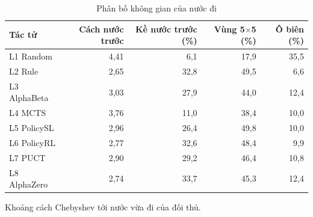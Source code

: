 \begin{table}[H]
  \centering
  \small
  \caption{Phân bố không gian của nước đi}
  \label{tab:cs-tk-khonggian}
  \begin{tabular}{lrrrr}
    \toprule
    Tác tử & Cách nước trước & Kề nước trước (\%) & Vùng 5$\times$5 (\%) & Ô biên (\%) \\
    \midrule
    L1 Random & 4,41 & 6,1 & 17,9 & 35,5 \\
    L2 Rule & 2,65 & 32,8 & 49,5 & 6,6 \\
    L3 AlphaBeta & 3,03 & 27,9 & 44,0 & 12,4 \\
    L4 MCTS & 3,76 & 11,0 & 38,4 & 10,0 \\
    L5 PolicySL & 2,96 & 26,4 & 49,8 & 10,0 \\
    L6 PolicyRL & 2,77 & 32,6 & 48,4 & 9,9 \\
    L7 PUCT & 2,90 & 29,2 & 46,4 & 10,8 \\
    L8 AlphaZero & 2,74 & 33,7 & 45,3 & 12,4 \\
    \bottomrule
  \end{tabular}
  \par\smallskip\parbox{.95\linewidth}{\footnotesize Khoảng cách Chebyshev tới nước vừa đi của đối thủ.}
\end{table}
